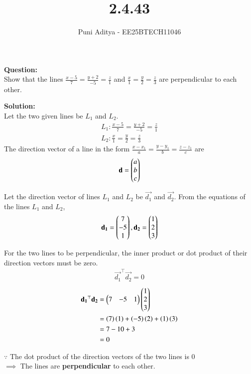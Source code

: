 \documentclass[journal]{IEEEtran}
\begin{document}
\title{2.4.43}
\author{Puni Aditya - EE25BTECH11046}
\maketitle

\textbf{Question:}\\
Show that the lines $\frac{x-5}{7}=\frac{y+2}{-5}=\frac{z}{1}$ and $\frac{x}{1}=\frac{y}{2}=\frac{z}{3}$ are perpendicular to each other.

\textbf{Solution:}\\
Let the two given lines be $L_1$ and $L_2$.
\begin{align*}
    L_1: \frac{x-5}{7} = \frac{y+2}{-5} = \frac{z}{1} \\
    L_2: \frac{x}{1} = \frac{y}{2} = \frac{z}{3}
\end{align*}
The direction vector of a line in the form $\frac{x-x_1}{a} = \frac{y-y_1}{b} = \frac{z-z_1}{c}$ are
\begin{align*}
\mathbf{d} = \begin{pmatrix}a \\ b \\ c\end{pmatrix}
\end{align*}

Let the direction vector of lines $L_1$ and $L_2$ be $\vec{d_1}$ and $\vec{d_2}$.
From the equations of the lines $L_1$ and $L_2$,
\begin{align}
    \mathbf{d_1} = \begin{pmatrix}7 \\ -5 \\ 1\end{pmatrix}, 
    \mathbf{d_2} = \begin{pmatrix}1 \\ 2 \\ 3\end{pmatrix}
\end{align}

For the two lines to be perpendicular, the inner product or dot product of their direction vectors must be zero.
\begin{align}
    \vec{d_1}^\top \vec{d_2} = 0 \label{eq:1}
\end{align}
\begin{align}
    \mathbf{d_1}^\top \mathbf{d_2} &= \begin{pmatrix}7&-5&1\end{pmatrix} \begin{pmatrix}1 \\ 2 \\ 3\end{pmatrix} \\
    &= \left(7\right)\left(1\right) + \left(-5\right)\left(2\right) + \left(1\right)\left(3\right) \\
    &= 7 - 10 + 3 \\
    &= 0
\end{align}

$\because$ The dot product of the direction vectors of the two lines is 0 \\
$\implies$ The lines are \textbf{perpendicular} to each other.
\end{document}
